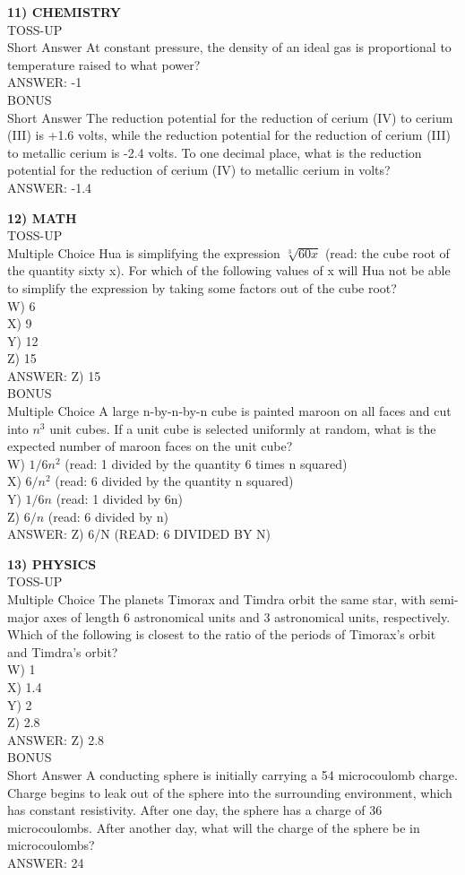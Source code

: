 \documentclass{article}
\begin{document}
\noindent \textbf{11) CHEMISTRY} \\
TOSS-UP \\
Short Answer At constant pressure, the density of an ideal gas is proportional to temperature raised to what power? \\
ANSWER: -1 \\
BONUS \\
Short Answer The reduction potential for the reduction of cerium (IV) to cerium (III) is +1.6 volts, while the reduction potential for the reduction of cerium (III) to metallic cerium is -2.4 volts. To one decimal place, what is the reduction potential for the reduction of cerium (IV) to metallic cerium in volts? \\
ANSWER: -1.4

\noindent \textbf{12) MATH} \\
TOSS-UP \\
Multiple Choice Hua is simplifying the expression $\sqrt[3]{60x}$ (read: the cube root of the quantity sixty x). For which of the following values of x will Hua not be able to simplify the expression by taking some factors out of the cube root? \\
W) 6 \\
X) 9 \\
Y) 12 \\
Z) 15 \\
ANSWER: Z) 15 \\
BONUS \\
Multiple Choice A large n-by-n-by-n cube is painted maroon on all faces and cut into $n^{3}$ unit cubes. If a unit cube is selected uniformly at random, what is the expected number of maroon faces on the unit cube? \\
W) $1/6n^{2}$ (read: 1 divided by the quantity 6 times n squared) \\
X) $6/n^{2}$ (read: 6 divided by the quantity n squared) \\
Y) $1/6n$ (read: 1 divided by 6n) \\
Z) $6/n$ (read: 6 divided by n) \\
ANSWER: Z) 6/N (READ: 6 DIVIDED BY N)

\noindent \textbf{13) PHYSICS} \\
TOSS-UP \\
Multiple Choice The planets Timorax and Timdra orbit the same star, with semi-major axes of length 6 astronomical units and 3 astronomical units, respectively. Which of the following is closest to the ratio of the periods of Timorax's orbit and Timdra's orbit? \\
W) 1 \\
X) 1.4 \\
Y) 2 \\
Z) 2.8 \\
ANSWER: Z) 2.8 \\
BONUS \\
Short Answer A conducting sphere is initially carrying a 54 microcoulomb charge. Charge begins to leak out of the sphere into the surrounding environment, which has constant resistivity. After one day, the sphere has a charge of 36 microcoulombs. After another day, what will the charge of the sphere be in microcoulombs? \\
ANSWER: 24
\end{document}
